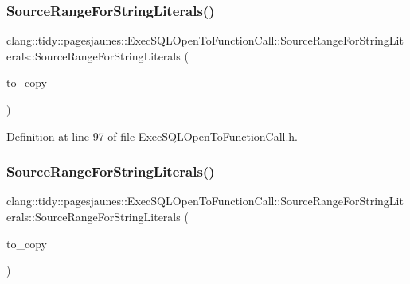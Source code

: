 \subsubsection{\texorpdfstring{Source\+Range\+For\+String\+Literals()}{SourceRangeForStringLiterals()}\hspace{0.1cm}{\footnotesize\ttfamily [5/6]}}
{\footnotesize\ttfamily clang\+::tidy\+::pagesjaunes\+::\+Exec\+S\+Q\+L\+Open\+To\+Function\+Call\+::\+Source\+Range\+For\+String\+Literals\+::\+Source\+Range\+For\+String\+Literals (\begin{DoxyParamCaption}\item[{\hyperlink{classclang_1_1tidy_1_1pagesjaunes_1_1_exec_s_q_l_open_to_function_call_1_1_source_range_for_string_literals}{Source\+Range\+For\+String\+Literals} $\ast$}]{to\+\_\+copy }\end{DoxyParamCaption})\hspace{0.3cm}{\ttfamily [inline]}}



Definition at line 97 of file Exec\+S\+Q\+L\+Open\+To\+Function\+Call.\+h.

\mbox{\label{classclang_1_1tidy_1_1pagesjaunes_1_1_exec_s_q_l_open_to_function_call_1_1_source_range_for_string_literals_a326acd9cd8030ca8ec7c8daf26e829cd}} 
\subsubsection{\texorpdfstring{Source\+Range\+For\+String\+Literals()}{SourceRangeForStringLiterals()}\hspace{0.1cm}{\footnotesize\ttfamily [6/6]}}
{\footnotesize\ttfamily clang\+::tidy\+::pagesjaunes\+::\+Exec\+S\+Q\+L\+Open\+To\+Function\+Call\+::\+Source\+Range\+For\+String\+Literals\+::\+Source\+Range\+For\+String\+Literals (\begin{DoxyParamCaption}\item[{\hyperlink{classclang_1_1tidy_1_1pagesjaunes_1_1_exec_s_q_l_open_to_function_call_1_1_source_range_for_string_literals}{Source\+Range\+For\+String\+Literals} const $\ast$}]{to\+\_\+copy }\end{DoxyParamCaption})\hspace{0.3cm}{\ttfamily [inline]}}



